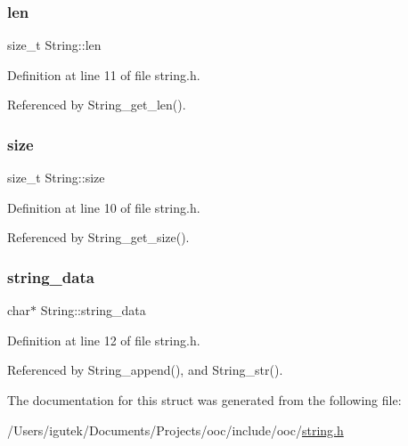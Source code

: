 \subsubsection{\texorpdfstring{len}{len}}
{\footnotesize\ttfamily size\+\_\+t String\+::len}



Definition at line 11 of file string.\+h.



Referenced by String\+\_\+get\+\_\+len().

\mbox{\label{structString_a467ea29ffa5dd45a89f7c01e199fd104}} 
\subsubsection{\texorpdfstring{size}{size}}
{\footnotesize\ttfamily size\+\_\+t String\+::size}



Definition at line 10 of file string.\+h.



Referenced by String\+\_\+get\+\_\+size().

\mbox{\label{structString_ac529e31052a3b2f49fd1f80cbe2327bb}} 
\subsubsection{\texorpdfstring{string\+\_\+data}{string\_data}}
{\footnotesize\ttfamily char$\ast$ String\+::string\+\_\+data}



Definition at line 12 of file string.\+h.



Referenced by String\+\_\+append(), and String\+\_\+str().



The documentation for this struct was generated from the following file\+:\begin{DoxyCompactItemize}
\item 
/\+Users/igutek/\+Documents/\+Projects/ooc/include/ooc/\mbox{\hyperlink{string_8h}{string.\+h}}\end{DoxyCompactItemize}
